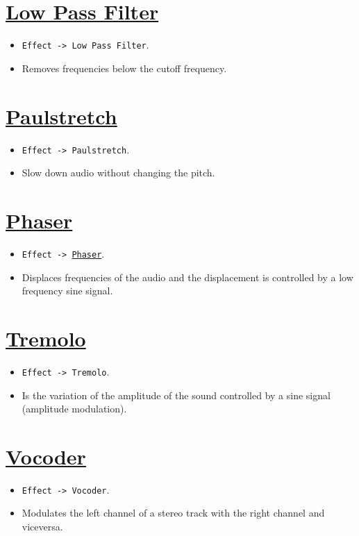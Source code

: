 \section{\href{http://manual.audacityteam.org/o/man/low_pass_filter.html}{Low Pass Filter}}
\begin{itemize}
\item \verb|Effect -> Low Pass Filter|.
\item Removes frequencies below the cutoff frequency.
\end{itemize}

\section{\href{http://manual.audacityteam.org/o/man/paulstretch.html}{Paulstretch}}
\begin{itemize}
\item \verb|Effect -> Paulstretch|.
\item Slow down audio without changing the pitch.
\end{itemize}

\section{\href{http://manual.audacityteam.org/o/man/phaser.html}{Phaser}}
\begin{itemize}
\item \texttt{Effect -> \href{http://en.wikipedia.org/wiki/Phaser\_(effect)}{Phaser}}.
\item Displaces frequencies of the audio and the displacement is
  controlled by a low frequency sine signal.
\end{itemize}

\section{\href{http://manual.audacityteam.org/o/man/tremolo.html}{Tremolo}}
\begin{itemize}
\item \verb|Effect -> Tremolo|.
\item Is the variation of the amplitude of the sound controlled by a
  sine signal (amplitude modulation).
\end{itemize}

\section{\href{http://manual.audacityteam.org/o/man/vocoder.html}{Vocoder}}
\begin{itemize}
\item \verb|Effect -> Vocoder|.
\item Modulates the left channel of a stereo track with the right channel and viceversa.
\end{itemize}

